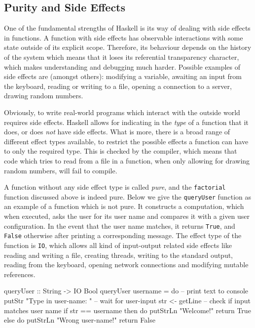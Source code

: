 \subsection{Purity and Side Effects}
\label{sec:purity_sideeffects}
One of the fundamental strengths of Haskell is its way of dealing with side effects in functions. A function with side effects has observable interactions with some state outside of its explicit scope. Therefore, its behaviour depends on the history of the system which means that it loses its referential transparency character, which makes understanding and debugging much harder. Possible examples of side effects are (amongst others): modifying a variable, awaiting an input from the keyboard, reading or writing to a file, opening a connection to a server, drawing random numbers.

Obviously, to write real-world programs which interact with the outside world requires side effects. Haskell allows for indicating in the \textit{type} of a function that it does, or does \textit{not} have side effects. What is more, there is a broad range of different effect types available, to restrict the possible effects a function can have to only the required type. This is checked by the compiler, which means that code which tries to read from a file in a function, when only allowing for drawing random numbers, will fail to compile.

A function without any side effect type is called \textit{pure}, and the \texttt{factorial} function discussed above is indeed pure. Below we give the \texttt{queryUser} function as an example of a function which is not pure. It constructs a computation, which when executed, asks the user for its user name and compares it with a given user configuration. In the event that the user name matches, it returns \texttt{True}, and \texttt{False} otherwise after printing a corresponding message. The effect type of the function is \texttt{IO}, which allows all kind of input-output related side effects like reading and writing a file, creating threads, writing to the standard output, reading from the keyboard, opening network connections and modifying mutable references.

\begin{HaskellCode}
queryUser :: String -> IO Bool
queryUser username = do
  -- print text to console
  putStr "Type in user-name: "
  -- wait for user-input
  str <- getLine
  -- check if input matches user name
  if str == username
    then do
      putStrLn "Welcome!"			
      return True
    else do
      putStrLn "Wrong user-name!"
      return False
\end{HaskellCode}

